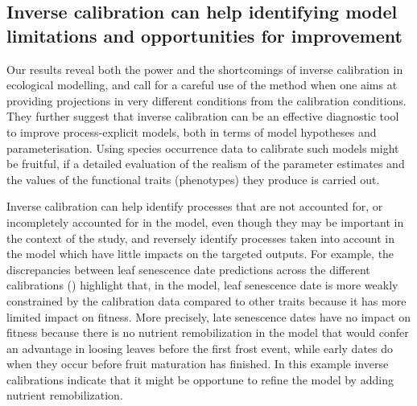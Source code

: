\documentclass[letterpaper,8pt]{extarticle}  %
\begin{document}
\begin{doublespacing}
\begin{linenumbers}

\subsection{Inverse calibration can help identifying model limitations and opportunities for improvement}

Our results reveal both the power and the shortcomings of inverse calibration in ecological modelling, and call for a careful use of the method when one aims at providing projections in very different conditions from the calibration conditions. They further suggest that inverse calibration can be an effective diagnostic tool to improve  process-explicit models, both in terms of model hypotheses and parameterisation. Using species occurrence data to calibrate such models might be fruitful, if a detailed evaluation of the realism of the parameter estimates and the values of the functional traits (phenotypes) they produce is carried out.

Inverse calibration can help identify processes that are not accounted for, or incompletely accounted for in the model, even though they may be important in the context of the study, and reversely identify processes taken into account in the model which have little impacts on the targeted outputs. For example, the discrepancies between leaf senescence date predictions across the different calibrations () highlight that, in the model, leaf senescence date is more weakly constrained by the calibration data compared to other traits because it has more limited impact on fitness. More precisely, late senescence dates have no impact on fitness because there is no nutrient remobilization in the model that would confer an advantage in loosing leaves before the first frost event, while early dates do when they occur before fruit maturation has finished. In this example inverse calibrations indicate that it might be opportune to refine the model by adding nutrient remobilization.


\end{linenumbers}
\end{doublespacing}
\end{document}
